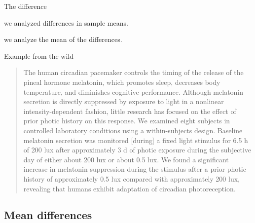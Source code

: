 \begin{frame}{The difference}

     we analyzed differences in sample means.

    \vspace{2em}

     we analyze the mean of the differences.

\end{frame}

\begin{frame}{Example from the wild}

    \begin{quote} \small
      The human circadian pacemaker controls the timing of the release of the pineal
      hormone melatonin, which promotes sleep, decreases body temperature, and
      diminishes cognitive performance. Although melatonin secretion
      is directly suppressed by exposure to light in a nonlinear intensity-dependent
      fashion, little research has focused on the effect of prior photic history on
      this response. We examined eight subjects in controlled laboratory conditions
      using a within-subjects design. Baseline melatonin secretion was monitored
      [during]
      a fixed light stimulus for 6.5 h of 200 lux after
      approximately 3 d of photic exposure during the subjective day of either about
      200 lux or about 0.5 lux. We found a
      significant increase in melatonin suppression during the stimulus after a prior
      photic history of approximately 0.5 lux compared with approximately 200 lux,
      revealing that humans exhibit adaptation of circadian photoreception. 
    \end{quote}


\end{frame}


\subsection{Mean differences}

